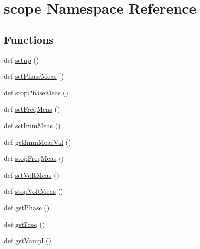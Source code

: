 \hypertarget{namespacescope}{}\section{scope Namespace Reference}
\label{namespacescope}
\subsection*{Functions}
\begin{DoxyCompactItemize}
\item 
def \hyperlink{namespacescope_a09366c9a1818975b290d31e6f3d224ff}{setup} ()
\item 
def \hyperlink{namespacescope_adec000df8052c67c9c8da426b44f410a}{set\+Phase\+Meas} ()
\item 
def \hyperlink{namespacescope_aa88689aabaecc9e9b66b401a508f876b}{stop\+Phase\+Meas} ()
\item 
def \hyperlink{namespacescope_a0a7d4a4f6d99ecebaa7bb1e1646ce872}{set\+Freq\+Meas} ()
\item 
def \hyperlink{namespacescope_a130065205e900c334beba78e350223d8}{set\+Imm\+Meas} ()
\item 
def \hyperlink{namespacescope_af9a59b27c9ee6359953c89975cb56be5}{get\+Imm\+Meas\+Val} ()
\item 
def \hyperlink{namespacescope_a9cd91e246a84ce7762339b534f77cefb}{stop\+Freq\+Meas} ()
\item 
def \hyperlink{namespacescope_ae9a76a589844597bfcde198348637c7e}{set\+Volt\+Meas} ()
\item 
def \hyperlink{namespacescope_a928d790c87e698f9244e5ed5710bd4cd}{stop\+Volt\+Meas} ()
\item 
def \hyperlink{namespacescope_a21fd73ed4fae6c56f2f02fe78cf14741}{get\+Phase} ()
\item 
def \hyperlink{namespacescope_a8962dd320b83664d5fd27c515a23294e}{get\+Freq} ()
\item 
def \hyperlink{namespacescope_a8124d99f9c980428b66eb5901cf6c916}{get\+Vampl} ()
\end{DoxyCompactItemize}
